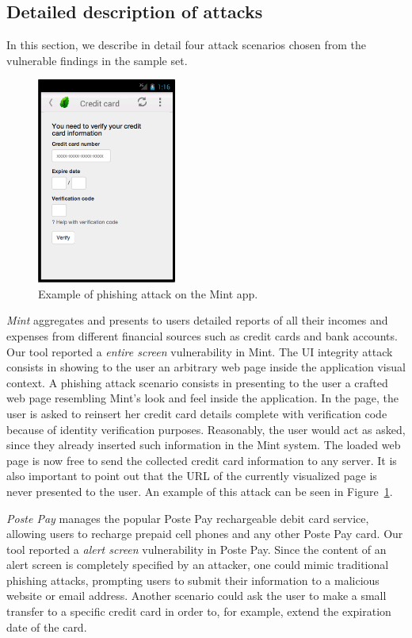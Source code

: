 \subsection{Detailed description of attacks}
\label{sec:remarkableResults}

In this section, we describe in detail four attack scenarios chosen from the vulnerable findings in the sample set. 

\begin{figure}[tb]
  \centering
    \includegraphics[width=1.8in]{./images/mint-example.png}
  \caption{Example of phishing attack on the Mint app.}
  \label{fig:mint}
\end{figure}

\textit{Mint} aggregates and presents to users detailed reports of all their incomes and expenses from different financial sources such as credit cards and bank accounts.
Our tool reported a \emph{entire screen} vulnerability in  Mint.
The UI integrity attack consists in showing to the user an arbitrary web page
inside the application visual context.
A phishing attack scenario consists in presenting to the user a crafted web page resembling Mint's look and feel inside the application. 
In the page, the user is asked to reinsert her credit card details complete
with verification code because of identity verification purposes. Reasonably, the user would act as asked, since they already inserted such information in the Mint system.
The loaded web page is now free to send the collected credit card information to any server. It is also important to point out that the URL of the currently visualized page is never presented to the user. An example of this attack can be seen in Figure~\ref{fig:mint}.

\textit{Poste Pay} manages the popular Poste Pay rechargeable debit card service, allowing users to recharge prepaid cell phones and any other Poste Pay card.
Our tool reported a \emph{alert screen} vulnerability in Poste Pay.
Since the content of an alert screen is completely specified by an attacker,
one could mimic traditional phishing attacks, prompting users to submit their information to a malicious website or email address. Another scenario could ask the user to make a small transfer to a specific credit card in order to, for example, extend the expiration date of the card.

